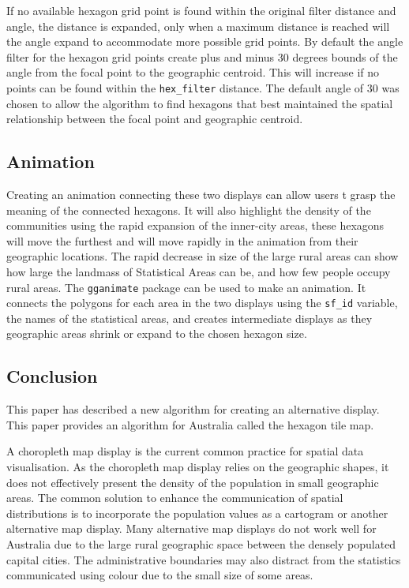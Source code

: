 If no available hexagon grid point is found within the original filter
distance and angle, the distance is expanded, only when a maximum
distance is reached will the angle expand to accommodate more possible
grid points. By default the angle filter for the hexagon grid points
create plus and minus 30 degrees bounds of the angle from the focal
point to the geographic centroid. This will increase if no points can be
found within the \texttt{hex\_filter} distance. The default angle of 30
was chosen to allow the algorithm to find hexagons that best maintained
the spatial relationship between the focal point and geographic
centroid.

\hypertarget{animation}{%
\subsection{Animation}\label{animation}}

Creating an animation connecting these two displays can allow users t
grasp the meaning of the connected hexagons. It will also highlight the
density of the communities using the rapid expansion of the inner-city
areas, these hexagons will move the furthest and will move rapidly in
the animation from their geographic locations. The rapid decrease in
size of the large rural areas can show how large the landmass of
Statistical Areas can be, and how few people occupy rural areas. The
\texttt{gganimate} \citep{gganimate} package can be used to make an
animation. It connects the polygons for each area in the two displays
using the \texttt{sf\_id} variable, the names of the statistical areas,
and creates intermediate displays as they geographic areas shrink or
expand to the chosen hexagon size.

\hypertarget{conclusion-03}{%
\subsection{Conclusion}\label{conclusion-03}}

This paper has described a new algorithm for creating an alternative
display. This paper provides an algorithm for Australia called the
hexagon tile map.

A choropleth map display is the current common practice for spatial data
visualisation. As the choropleth map display relies on the geographic
shapes, it does not effectively present the density of the population in
small geographic areas. The common solution to enhance the communication
of spatial distributions is to incorporate the population values as a
cartogram or another alternative map display. Many alternative map
displays do not work well for Australia due to the large rural
geographic space between the densely populated capital cities. The
administrative boundaries may also distract from the statistics
communicated using colour due to the small size of some areas.

